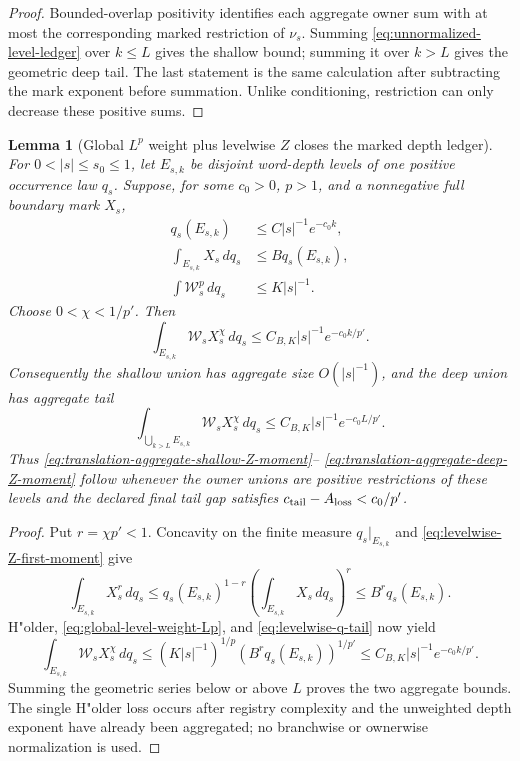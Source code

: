 \documentclass[11pt]{article}
\newtheorem{lemma}[theorem]{Lemma}
\begin{document}
\begin{proof}
Bounded-overlap positivity identifies each aggregate owner sum with at most
the corresponding marked restriction of $\nu_s$.  Summing
\eqref{eq:unnormalized-level-ledger} over $k\le L$ gives the shallow bound;
summing it over $k>L$ gives the geometric deep tail.  The last statement is
the same calculation after subtracting the mark exponent before summation.
Unlike conditioning, restriction can only decrease these positive sums.
\end{proof}

\begin{lemma}[Global $L^p$ weight plus levelwise $Z$ closes the marked
depth ledger]
\label{lem:global-Lp-levelwise-Z}
For $0<|s|\le s_0\le1$, let $E_{s,k}$ be disjoint word-depth levels of one
positive occurrence law $q_s$.  Suppose, for some $c_0>0$, $p>1$, and a
nonnegative full boundary mark $X_s$,
\begin{align}
 q_s(E_{s,k})&\le C|s|^{-1}e^{-c_0k},
 \label{eq:levelwise-q-tail}\\
 \int_{E_{s,k}}X_s\,dq_s&\le Bq_s(E_{s,k}),
 \label{eq:levelwise-Z-first-moment}\\
 \int \mathcal W_s^p\,dq_s&\le K|s|^{-1}.
 \label{eq:global-level-weight-Lp}
\end{align}
Choose $0<\chi<1/p'$.  Then
\begin{equation}
\label{eq:derived-marked-level-ledger}
 \int_{E_{s,k}}\mathcal W_sX_s^\chi\,dq_s
 \le C_{B,K}|s|^{-1}e^{-c_0k/p'}.
\end{equation}
Consequently the shallow union has aggregate size $O(|s|^{-1})$, and the
deep union has aggregate tail
\begin{equation}
\label{eq:derived-marked-deep-tail}
 \int_{\bigcup_{k>L}E_{s,k}}
 \mathcal W_sX_s^\chi\,dq_s
 \le C_{B,K}|s|^{-1}e^{-c_0L/p'}.
\end{equation}
Thus \eqref{eq:translation-aggregate-shallow-Z-moment}--
\eqref{eq:translation-aggregate-deep-Z-moment} follow whenever the owner
unions are positive restrictions of these levels and the declared final
tail gap satisfies
$c_{\rm tail}-A_{\rm loss}<c_0/p'$.
\end{lemma}

\begin{proof}
Put $r=\chi p'<1$.  Concavity on the finite measure
$q_s|_{E_{s,k}}$ and \eqref{eq:levelwise-Z-first-moment} give
\[
 \int_{E_{s,k}}X_s^r\,dq_s
 \le q_s(E_{s,k})^{1-r}
      \left(\int_{E_{s,k}}X_s\,dq_s\right)^r
 \le B^r q_s(E_{s,k}).
\]
H"older, \eqref{eq:global-level-weight-Lp}, and
\eqref{eq:levelwise-q-tail} now yield
\[
 \int_{E_{s,k}}\mathcal W_sX_s^\chi\,dq_s
 \le (K|s|^{-1})^{1/p}
      (B^rq_s(E_{s,k}))^{1/p'}
 \le C_{B,K}|s|^{-1}e^{-c_0k/p'}.
\]
Summing the geometric series below or above $L$ proves the two aggregate
bounds.  The single H"older loss occurs after registry complexity and the
unweighted depth exponent have already been aggregated; no branchwise or
ownerwise normalization is used.
\end{proof}
\end{document}
